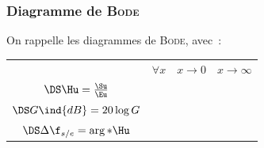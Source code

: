 \documentclass[../../main/main.tex]{subfiles}
\begin{document}
\subsubsection{Diagramme de \textsc{Bode}}
On rappelle les diagrammes de \textsc{Bode}, avec~:
\smallbreak
\noindent
\begin{minipage}{\linewidth}
	\begin{center}
		\begin{tabularx}{\linewidth}{cYYY}
			\toprule
			 &
			$\forall x$
			 &
			$x\to 0$
			 &
			$x\to\infty$
			\\
			\addlinespace[0.5em]
			\cmidrule(lr){2-4}
			$\DS\Hu = \frac{\Su}{\Eu}$
			 &
			 &
			 &
			\\
			\addlinespace[0.5em]
			$\DS G\ind{dB} = 20 \log G$
			 &
			 &
			 &
			\\
			\addlinespace[0.5em]
			$\DS\Delta\f_{s/e} = \arg*{\Hu}$
			 &
			 &
			 &
			\\
			\bottomrule
		\end{tabularx}
		\label{tab:rcc}
	\end{center}
\end{minipage}
\end{document}
